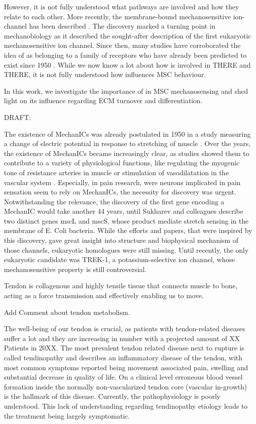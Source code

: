 However, it is not fully understood what pathways are involved and how they relate to each other.  More recently, the membrane-bound mechanosensitive ion-channel \Piezo{} has been described \cite{Coste2010}. The discovery marked a turning point in mechanobiology as it described the sought-after description of the first eukaryotic mechanosensitive ion channel. Since then, many studies have corroborated the idea of \Piezo{} as belonging to a family of receptors who have already been predicted to exist since 1950 \cite{Katz1949}. While we now know a lot about how \Piezo{} is involved in THERE and THERE, it is not fully understood how \Piezo{} influences MSC behaviour. \par
In this work, we investigate the importance of \Piezo{} in MSC mechanosensing and shed light on its influence regarding ECM turnover and differentiation.


DRAFT: 


The existence of MechanICs was already postulated in 1950 in a study measuring a change of electric potential in response to stretching of muscle \cite{Katz1949}. Over the years, the existence of MechanICs became increasingly clear, as studies showed them to contribute to a variety of physiological functions, like regulating the myogenic tone of resistance arteries in muscle \cite{Murthy2017} or stimulation of vasodilatation in the vascular system \cite{Zeng2018}. Especially, in pain research, were neurons implicated in pain sensation seem to rely on MechanICs, the necessity for discovery was urgent. Notwithstanding the relevance, the discovery of the first gene encoding a MechanIC would take another 44 years, until Sukharev and colleagues describe two distinct genes mscL and mscS, whose product mediate stretch sensing in the membrane of E. Coli bacteria. While the efforts and papers, that were inspired by this discovery, gave great insight into structure and biophysical mechanism of those channels, eukaryotic homologues were still missing. Until recently, the only eukaryotic candidate was TREK-1, a potassium-selective ion channel, whose mechanosensitive property is still controversial. 

Tendon is collagenous and highly tensile tissue that connects muscle to bone, acting as a force transmission and effectively enabling us to move. 

Add Comment about tendon metabolism. 

The well-being of our tendon is crucial, as patients with tendon-related diseases suffer a lot and they are increasing in number with a projected amount of XX Patients in 20XX. The most prevalent tendon related disease next to rupture is called tendinopathy and describes an inflammatory disease of the tendon, with most common symptoms reported being movement associated pain, swelling and substantial decrease in quality of life. On a clinical level erroneous blood vessel formation inside the normally non-vascularized tendon core (vascular in-growth) is the hallmark of this disease. Currently, the pathophysiology is poorly understood. This lack of understanding regarding tendinopathy etiology leads to the treatment being largely symptomatic. 

